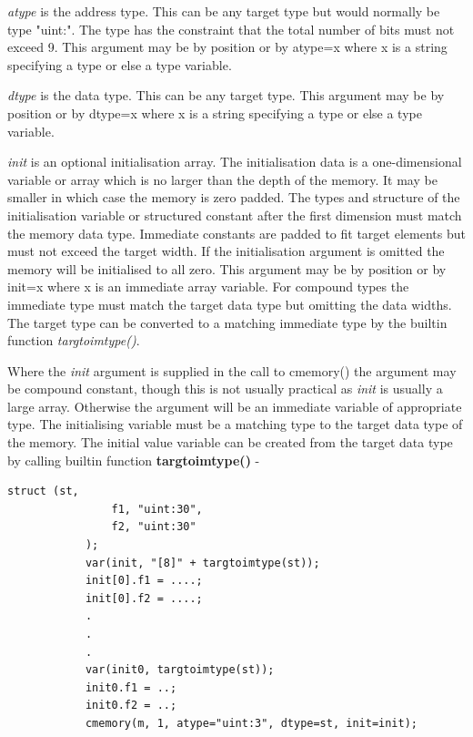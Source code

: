         {\em atype} is the address type. This can be any target type but
        would normally be type "uint:". The type has the constraint that the total number of
        bits must not exceed 9. This argument may be by position or by
        atype=x where x is a string specifying a type or else a type variable.       

        {\em dtype} is the data type. This can be any target type. This argument
        may be by position or by dtype=x where x is a string specifying a type
        or else a type variable.
        
        {\em init} is an optional initialisation array. The initialisation data
        is a one-dimensional variable or array which is no larger than the depth
        of the memory. It may be smaller in which case the memory is zero
        padded. The types and structure of the initialisation variable or
        structured constant after the first dimension must match the memory data
        type. Immediate constants are padded to fit target elements but must not
        exceed the target width. If the initialisation argument is omitted the
        memory will be initialised to all zero. This argument may be by position
        or by init=x where x is an immediate array variable. For compound types
        the immediate type must match the target data type but omitting the data
        widths. The target type can be converted to a matching immediate type
        by the builtin function {\em targtoimtype()}.
        
        Where the {\em init} argument is supplied in the call to cmemory() the
        argument may be compound constant, though this is not usually practical as
        {\em init} is usually a large array. Otherwise the argument will be
        an immediate variable of appropriate type. The initialising variable must be a
        matching type to the target data type of the memory. The initial value
        variable can be created from the target data type by calling builtin function
        {\bf targtoimtype()}  -

        \begin{lstlisting}[gobble=8, language=threepl]
            struct (st,
                f1, "uint:30",
                f2, "uint:30"
            );
            var(init, "[8]" + targtoimtype(st));
            init[0].f1 = ....;
            init[0].f2 = ....;
            .
            .
            .
            var(init0, targtoimtype(st));
            init0.f1 = ..;
            init0.f2 = ..;
            cmemory(m, 1, atype="uint:3", dtype=st, init=init);
        \end{lstlisting}
            
